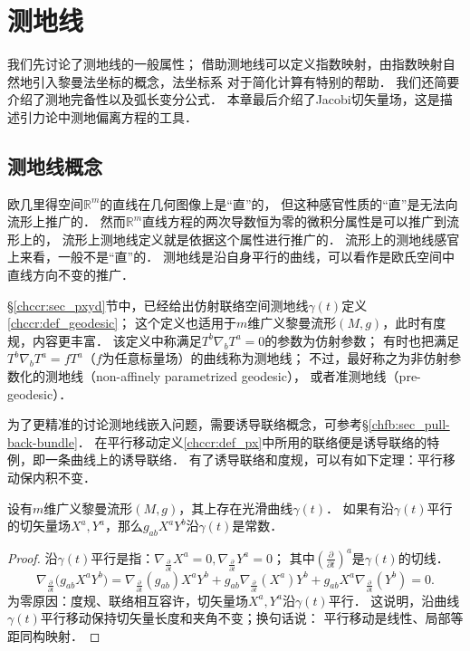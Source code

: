 
\chapter{测地线}\label{chgd}

我们先讨论了测地线的一般属性；
借助测地线可以定义指数映射，由指数映射自然地引入黎曼法坐标的概念，法坐标系
对于简化计算有特别的帮助．
我们还简要介绍了测地完备性以及弧长变分公式．
本章最后介绍了Jacobi切矢量场，这是描述引力论中测地偏离方程的工具．




\section{测地线概念}\label{chgd:sec_concept}
欧几里得空间$\mathbb{R}^m$的直线在几何图像上是“直”的，
但这种感官性质的“直”是无法向流形上推广的．
然而$\mathbb{R}^m$直线方程的两次导数恒为零的{\kaishu 微积分属性}是可以推广到流形上的，
流形上测地线定义就是依据这个属性进行推广的．
流形上的测地线感官上来看，一般不是“直”的．
测地线是沿自身平行的曲线，可以看作是欧氏空间中直线方向不变的推广．

\S \ref{chccr:sec_pxyd}节中，已经给出仿射联络空间测地线$\gamma(t)$定义\ref{chccr:def_geodesic}；
这个定义也适用于$m$维广义黎曼流形$(M,g)$，此时有度规，内容更丰富．
该定义中称满足$T^b \nabla _b T^a=0$的参数为仿射参数；
有时也把满足$T^b \nabla _b T^a =f T^a$（$f$为任意标量场）的曲线称为测地线；
不过，最好称之为{\kaishu 非仿射参数化的测地线（non-affinely parametrized geodesic）}，
或者{\kaishu 准测地线}（pre-geodesic）．


为了更精准的讨论测地线嵌入问题，需要诱导联络概念，可参考\S\ref{chfb:sec_pull-back-bundle}．
在平行移动定义\ref{chccr:def_px}中所用的联络便是诱导联络的特例，即一条曲线上的诱导联络．
有了诱导联络和度规，可以有如下定理：平行移动保内积不变．
\begin{theorem}\label{chgd:thm_parallel-metric}
    设有$m$维广义黎曼流形$(M,g)$，其上存在光滑曲线$\gamma(t)$．
    如果有沿$\gamma(t)$平行的切矢量场$X^a, Y^a$，那么$g_{ab}X^aY^b$沿$\gamma(t)$是常数．
\end{theorem}
\begin{proof}
    沿$\gamma(t)$平行是指：$\nabla_{\frac{\partial}{\partial t}}X^a=0,
     \nabla_{\frac{\partial}{\partial t}}Y^a=0$；
    其中$(\frac{\partial}{\partial t})^a$是$\gamma(t)$的切线．
    \begin{equation*}
        \nabla_{\frac{\partial}{\partial t}}\bigl( g_{ab}X^aY^b \bigr)
        =\nabla_{\frac{\partial}{\partial t}}( g_{ab} ) X^aY^b
        +g_{ab}\nabla_{\frac{\partial}{\partial t}}( X^a ) Y^b
        +g_{ab}X^a\nabla_{\frac{\partial}{\partial t}}( Y^b )     =0.
    \end{equation*}
    为零原因：度规、联络相互容许，切矢量场$X^a, Y^a$沿$\gamma(t)$平行．
    这说明，沿曲线$\gamma(t)$平行移动保持切矢量长度和夹角不变；换句话说：
    平行移动是线性、局部等距同构映射．
\end{proof}

